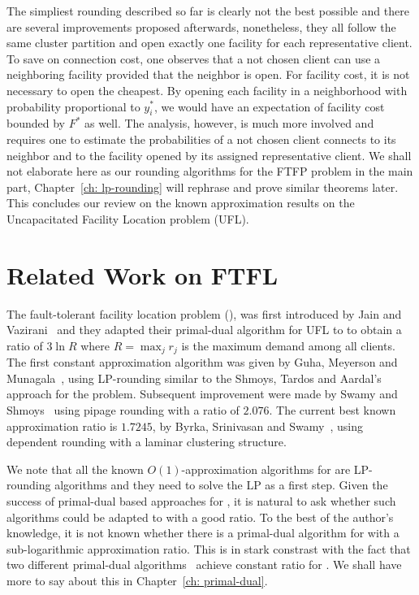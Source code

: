 \documentclass[oneside,final]{ucr}
\begin{document}
The simpliest rounding described so far is clearly not the
best possible and there are several improvements proposed
afterwards, nonetheless, they all follow the same cluster
partition and open exactly one facility for each
representative client. To save on connection cost, one
observes that a not chosen client can use a neighboring
facility provided that the neighbor is open. For facility
cost, it is not necessary to open the cheapest. By opening
each facility in a neighborhood with probability
proportional to $y_i^\ast$, we would have an expectation of
facility cost bounded by $F^\ast$ as well. The analysis,
however, is much more involved and requires one to estimate
the probabilities of a not chosen client connects to its
neighbor and to the facility opened by its assigned
representative client. We shall not elaborate here as our
rounding algorithms for the FTFP problem in the main part,
Chapter~\ref{ch: lp-rounding} will rephrase and prove
similar theorems later. This concludes our review on the
known approximation results on the Uncapacitated Facility
Location problem (UFL).


\section{Related Work on FTFL}
The fault-tolerant facility location problem (\FTFL), was
first introduced by Jain and Vazirani~\cite{JainV03} and
they adapted their primal-dual algorithm for UFL to {\FTFL}
to obtain a ratio of $3\ln R$ where $R=\max_j r_j$ is the
maximum demand among all clients. The first constant
approximation algorithm was given by Guha, Meyerson and
Munagala~\cite{GuhaMM03}, using LP-rounding similar to the
Shmoys, Tardos and Aardal's~\cite{ShmoysTA97} approach for
the {\UFL} problem. Subsequent improvement were made by
Swamy and Shmoys~\cite{SwamyS08} using pipage rounding with
a ratio of $2.076$. The current best known approximation
ratio is $1.7245$, by Byrka, Srinivasan and
Swamy~\cite{ByrkaSS10}, using dependent rounding with a
laminar clustering structure.

We note that all the known $O(1)$-approximation algorithms
for {\FTFL} are LP-rounding algorithms and they need to
solve the LP as a first step. Given the success of
primal-dual based approaches for {\UFL}, it is natural to
ask whether such algorithms could be adapted to {\FTFL} with
a good ratio. To the best of the author's knowledge, it is
not known whether there is a primal-dual algorithm for
{\FTFL} with a sub-logarithmic approximation ratio. This is
in stark constrast with the fact that two different
primal-dual algorithms~\cite{JainV03,JainMMSV03} achieve
constant ratio for {\UFL}. We shall have more to say about
this in Chapter~\ref{ch: primal-dual}.
\end{document}
